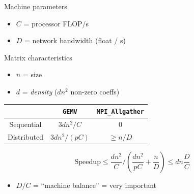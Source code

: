 \documentclass[xcolor={rgb,x11names,svgnames},rgb,x11names,svgnames]{beamer}
\begin{document}
\begin{frame}[label=1d]
\begin{center}
  \end{center}
\end{frame}


\begin{frame}[label=1d]

  \begin{alertblock}{Machine parameters}
    \begin{itemize}
    \item $C$ = processor FLOP/s
    \item $D$ = network bandwidth (float / s)
    \end{itemize}
  \end{alertblock}

  \begin{exampleblock}{Matrix characteristics}
    \begin{itemize}
    \item $n$ = size
    \item $d$ = \emph{density} ($dn^2$ non-zero coeffs)
    \end{itemize}
  \end{exampleblock}

  \begin{center}
    \begin{tabular}{|c||c|c|}
      \hline
      & \texttt{GEMV}  & \texttt{MPI\_Allgather} \\
      \hline\hline
      Sequential           & $3 d n^2 / C$ &    0 \\
      \hline
      Distributed          & $3 d n^2 / (pC)$ & $\geq n / D$ \\
      \hline
    \end{tabular}
  \end{center}

  \[
    \mathrm{Speedup} \leq \frac{d n^2}{C} / (\frac{d n^2}{pC} + \frac{n}{D}) \leq d n \frac{D}{C}
  \]

  \begin{itemize}
  \item $D/C$ = ``machine balance'' = very important
 \end{itemize}
\end{frame}
\end{document}
